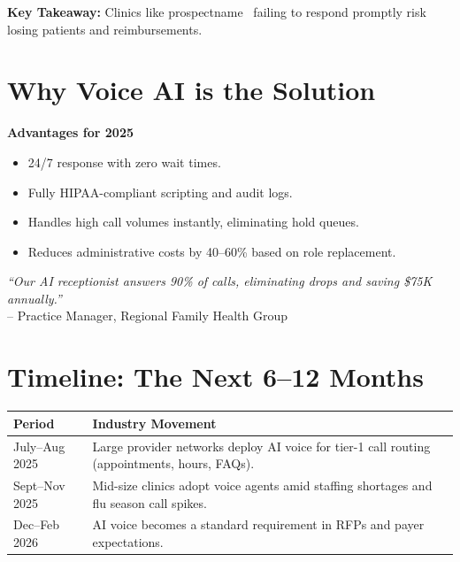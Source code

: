 \documentclass[10pt]{article}
\newcommand{\prospectname}{{ prospectname }}
\begin{document}
\textbf{Key Takeaway:} Clinics like \prospectname\ failing to respond promptly risk losing patients and reimbursements.

\newpage

\section*{Why Voice AI is the Solution}
\textbf{Advantages for 2025}
\begin{itemize}
    \item 24/7 response with zero wait times.
    \item Fully HIPAA-compliant scripting and audit logs.
    \item Handles high call volumes instantly, eliminating hold queues.
    \item Reduces administrative costs by 40--60\% based on role replacement.
\end{itemize}

\vspace{0.8cm}
\begin{flushright}
    \textit{``Our AI receptionist answers 90\% of calls, eliminating drops and saving \$75K annually.''} \\
    -- Practice Manager, Regional Family Health Group
\end{flushright}

\vspace{1cm}

\section*{Timeline: The Next 6--12 Months}
\begin{tabular}{>{\raggedright\arraybackslash}p{3.5cm} >{\raggedright\arraybackslash}p{9cm}}
    \toprule
    \textbf{Period} & \textbf{Industry Movement} \\
    \midrule
    \addlinespace[0.3cm]
    July--Aug 2025 & Large provider networks deploy AI voice for tier-1 call routing (appointments, hours, FAQs). \\
    \addlinespace[0.3cm]
    Sept--Nov 2025 & Mid-size clinics adopt voice agents amid staffing shortages and flu season call spikes. \\
    \addlinespace[0.3cm]
    Dec--Feb 2026 & AI voice becomes a standard requirement in RFPs and payer expectations. \\
    \bottomrule
\end{tabular}
\end{document}
